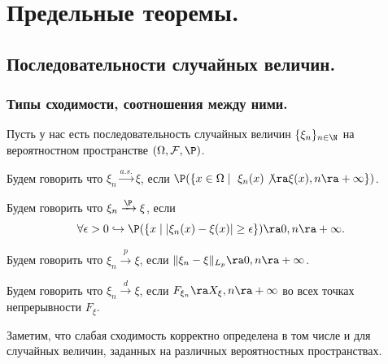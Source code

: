 
\section{Предельные теоремы.}
\subsection{Последовательности случайных величин.}
\subsubsection{Типы сходимости, соотношения между ними.}
Пусть у нас есть последовательность случайных величин $\{\xi_n\}_{n \in \N}$ на вероятностном пространстве $(\Omega, \mathcal{F}, \P)$.
\begin{definition}
    Будем говорить что $\xi_n \xrightarrow{a.s.} \xi$, если $\P(\{x \in \Omega \mid \  \xi_n(x) \not\ra \xi(x), n \ra +\infty\})$.
\end{definition}
\begin{definition}
    Будем говорить что $\xi_n \xrightarrow{\P} \xi$, если \[\forall \epsilon > 0 \hookrightarrow \P(\{x \mid |\xi_n(x) - \xi(x)| \geq \epsilon \}) \ra 0, n \ra +\infty.\]
\end{definition}
\begin{definition}
    Будем говорить что $\xi_n \xrightarrow{p} \xi$, если $\|\xi_n - \xi\|_{L_p} \ra 0, n \ra +\infty$.
\end{definition}
\begin{definition}
    Будем говорить что $\xi_n \xrightarrow{d} \xi$, если $F_{\xi_n} \ra X_{\xi}, n \ra +\infty$ во всех точках непрерывности $F_{\xi}$.
\end{definition}
\begin{note}
    Заметим, что слабая сходимость корректно определена в том числе и для случайных величин, заданных на различных вероятностных пространствах.
\end{note}
